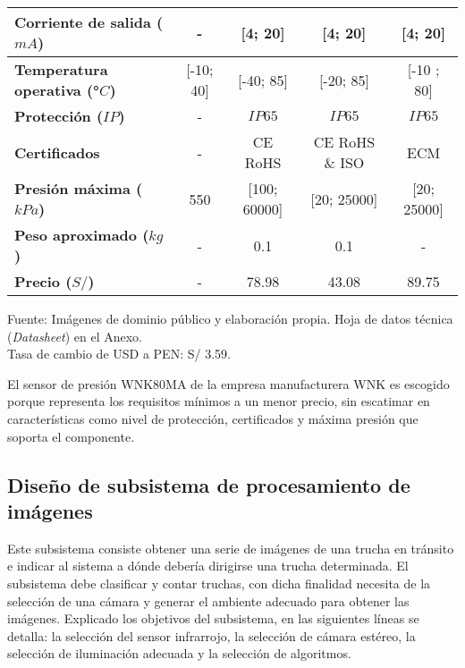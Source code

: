 \begin{itemize}
\begin{mytable}[H]
\begin{tabular}{l|c|c|c|c|}
	 		\multicolumn{1}{|l|}{\textbf{Corriente de salida ($mA$)}} & - & [4; 20] & [4; 20] & [4; 20] \\ \hline
	 		\multicolumn{1}{|l|}{\textbf{Temperatura operativa (°$C$)}} & [-10; 40] & [-40; 85] & [-20; 85] & [-10 ; 80] \\ \hline
	 		\multicolumn{1}{|l|}{\textbf{Protección ($IP$)}} & - & $IP65$ & $IP65$ & $IP65$ \\ \hline
	 		\multicolumn{1}{|l|}{\textbf{Certificados}} & - & CE RoHS & CE RoHS \& ISO & ECM \\ \hline
	 		\multicolumn{1}{|l|}{\textbf{Presión máxima ($kPa$)}} & 550 & [100; 60000] & [20; 25000] & [20; 25000] \\ \hline
	 		\multicolumn{1}{|l|}{\textbf{Peso aproximado ($kg$)}} & - & 0.1 & 0.1 & - \\ \hline
	 		\multicolumn{1}{|l|}{\textbf{Precio ($S/$)}} & - & 78.98 & 43.08 & 89.75 \\ \hline		
	 	\end{tabular}	
	 	\begin{myflushcenteraftertable}			
	 		Fuente: Imágenes de dominio público y elaboración propia. Hoja de datos técnica (\textit{Datasheet}) en el Anexo. \\
	 		Tasa de cambio de USD a PEN: S/ 3.59.
	 	\end{myflushcenteraftertable}
	\end{mytable}
	
	El sensor de presión WNK80MA de la empresa manufacturera WNK es escogido porque representa los requisitos mínimos a un menor precio, sin escatimar en características como nivel de protección, certificados y máxima presión que soporta el componente.	
	
\end{itemize}


\subsection{Diseño de subsistema de procesamiento de imágenes}
\label{ssec:diseno de subsistema de procesamiento de imágenes}

Este subsistema consiste obtener una serie de imágenes de una trucha en tránsito e indicar al sistema a dónde debería dirigirse una trucha determinada. El subsistema debe clasificar y contar truchas, con dicha finalidad necesita de la selección de una cámara y generar el ambiente adecuado para obtener las imágenes. Explicado los objetivos del subsistema, en las siguientes líneas se detalla: la selección del sensor infrarrojo, la selección de cámara estéreo, la selección de iluminación adecuada y la selección de algoritmos.

